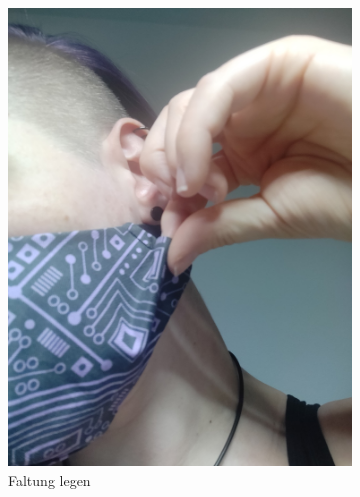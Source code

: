 \documentclass[12pt,parskip=full]{scrartcl}
\begin{document}
\begin{figure}[hp]
\begin{subfigure}{0.48\textwidth}
        \includegraphics[width = \linewidth]{Pictures/11_Folding/Folding2_resized.jpg}
        \caption{Faltung legen}
        \label{Folding2}
    \end{subfigure}
    \begin{subfigure}{0.48\textwidth}
        \centering

\end{subfigure}
\end{figure}
\end{document}
